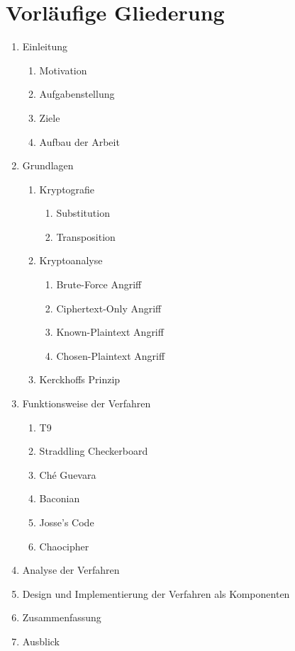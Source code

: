 \documentclass[fontsize=11pt, paper=a4, parskip=half]{scrartcl}
\begin{document}
\section{Vorläufige Gliederung}
\begin{enumerate}
	\item{Einleitung}
		\begin{enumerate}[label={\arabic*.}]
		\item{Motivation}
		\item{Aufgabenstellung}
		\item{Ziele}
		\item{Aufbau der Arbeit}
		\end{enumerate}
	\item{Grundlagen}
		\begin{enumerate}[label={\arabic*.}]
			\item{Kryptografie}
				\begin{enumerate}[label={\arabic*.}]
					\item{Substitution}
					\item{Transposition}
				\end{enumerate}
			\item{Kryptoanalyse}
				\begin{enumerate}[label={\arabic*.}]
					\item{Brute-Force Angriff}
					\item{Ciphertext-Only Angriff}
					\item{Known-Plaintext Angriff}
					\item{Chosen-Plaintext Angriff}
				\end{enumerate}
			\item{Kerckhoffs Prinzip}
		\end{enumerate}
	\item{Funktionsweise der Verfahren}
		\begin{enumerate}[label={\arabic*.}]
			\item{T9}
			\item{Straddling Checkerboard}
			\item{Ché Guevara}
			\item{Baconian}
			\item{Josse's Code}
			\item{Chaocipher}
		\end{enumerate}
	\item{Analyse der Verfahren}
	\item{Design und Implementierung der Verfahren als Komponenten}
	\item{Zusammenfassung}
	\item{Ausblick}
\end{enumerate}

\newpage


\nocite{*}
\cleardoublepage
{}
{}

\end{document}
